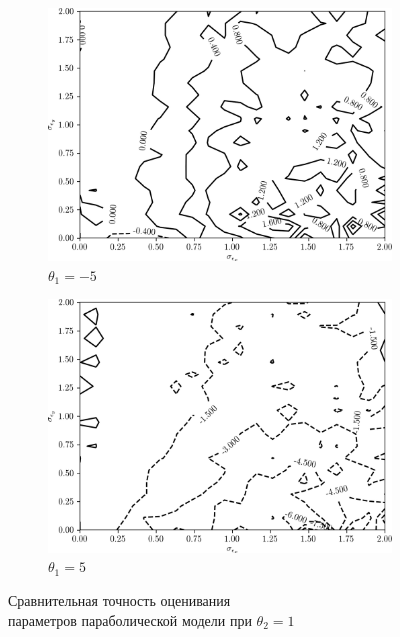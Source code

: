 \begin{figure}[p]
  \begin{subfigure}[b]{\linewidth}
    \centering
    \includegraphics[width=135mm]{fig/nonlinear/quadratic/a-0_b--5_c-1.png}
    \caption{\( \theta_1 = -5 \)}\label{fig:comparison_nonlinear_quadratic_b--5_c-1}
  \end{subfigure}

  \vspace{2\baselineskip}
  \begin{subfigure}[b]{\linewidth}
    \centering
    \includegraphics[width=135mm]{fig/nonlinear/quadratic/a-0_b-5_c-1.png}
    \caption{\( \theta_1 = 5 \)}\label{fig:comparison_nonlinear_quadratic_b-5_c-1}
  \end{subfigure}

  \vspace{\baselineskip}
  \caption{
    Сравнительная точность оценивания \\
    параметров параболической модели при \( \theta_2 = 1 \)
  }\label{fig:comparison_nonlinear_quadratic_c-1}
\end{figure}

